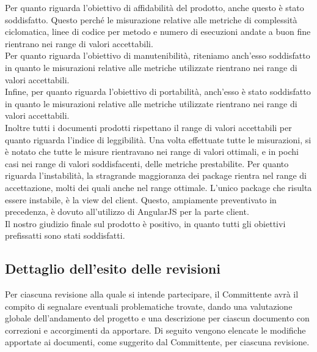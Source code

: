 Per quanto riguarda l'obiettivo di affidabilità del prodotto, anche questo è stato soddisfatto. Questo perché le misurazione relative alle metriche di complessità ciclomatica, linee di codice per metodo e numero di esecuzioni andate a buon fine rientrano nei range di valori accettabili.\\
Per quanto riguarda l'obiettivo di manutenibilità, riteniamo anch'esso soddisfatto in quanto le misurazioni relative alle metriche utilizzate rientrano nei range di valori accettabili.\\
Infine, per quanto riguarda l'obiettivo di portabilità, anch'esso è stato soddisfatto in quanto le misurazioni relative alle metriche utilizzate rientrano nei range di valori accettabili.\\
Inoltre tutti i documenti prodotti rispettano il range di valori accettabili per quanto riguarda l'indice di leggibilità. 
Una volta effettuate tutte le misurazioni, si è notato che tutte le misure rientravano nei range  di valori ottimali, e in pochi casi nei range di valori soddisfacenti, delle metriche prestabilite.
Per quanto riguarda l'instabilità, la stragrande maggioranza dei package rientra nel range di accettazione, molti dei quali anche nel range ottimale. L'unico package che risulta essere instabile, è la view del client. Questo, ampiamente preventivato in precedenza, è dovuto all'utilizzo di AngularJS per la parte client.\\
Il nostro giudizio finale sul prodotto è positivo, in quanto tutti gli obiettivi prefissatti sono stati soddisfatti.

\subsection{Dettaglio dell'esito delle revisioni}
Per ciascuna revisione alla quale si intende partecipare, il Committente avrà il compito di segnalare eventuali problematiche trovate, dando una valutazione globale dell'andamento del progetto e una descrizione per ciascun documento con correzioni e accorgimenti da apportare.
Di seguito vengono elencate le modifiche apportate ai documenti, come suggerito dal Committente, per ciascuna revisione.
